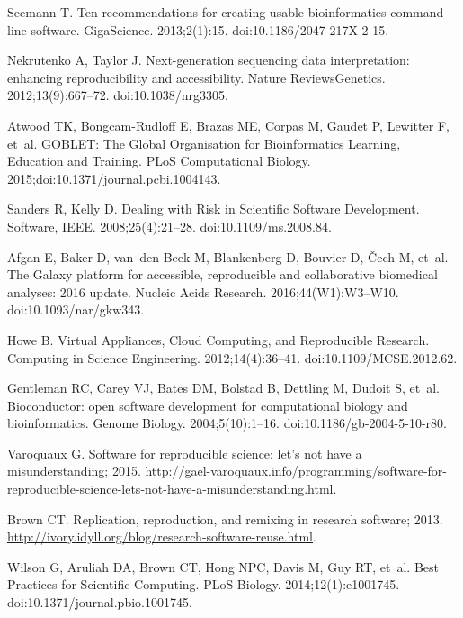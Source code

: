 \documentclass[10pt,letterpaper]{article}
\begin{document}
\begin{thebibliography}{10}
Seemann T.
\newblock Ten recommendations for creating usable bioinformatics command line
  software.
\newblock GigaScience. 2013;2(1):15.
\newblock doi:{10.1186/2047-217X-2-15}.

Nekrutenko A, Taylor J.
\newblock Next-generation sequencing data interpretation: enhancing
  reproducibility and accessibility.
\newblock Nature ReviewsGenetics. 2012;13(9):667--72.
\newblock doi:{10.1038/nrg3305}.

Atwood TK, Bongcam-Rudloff E, Brazas ME, Corpas M, Gaudet P, Lewitter F, et~al.
\newblock GOBLET: The Global Organisation for Bioinformatics Learning,
  Education and Training.
\newblock PLoS Computational Biology. 2015;doi:{10.1371/journal.pcbi.1004143}.

Sanders R, Kelly D.
\newblock Dealing with Risk in Scientific Software Development.
\newblock Software, IEEE. 2008;25(4):21--28.
\newblock doi:{10.1109/ms.2008.84}.

Afgan E, Baker D, van~den Beek M, Blankenberg D, Bouvier D, Čech M, et~al.
\newblock The Galaxy platform for accessible, reproducible and collaborative
  biomedical analyses: 2016 update.
\newblock Nucleic Acids Research. 2016;44(W1):W3--W10.
\newblock doi:{10.1093/nar/gkw343}.

Howe B.
\newblock Virtual Appliances, Cloud Computing, and Reproducible Research.
\newblock Computing in Science Engineering. 2012;14(4):36--41.
\newblock doi:{10.1109/MCSE.2012.62}.

Gentleman RC, Carey VJ, Bates DM, Bolstad B, Dettling M, Dudoit S, et~al.
\newblock Bioconductor: open software development for computational biology and
  bioinformatics.
\newblock Genome Biology. 2004;5(10):1--16.
\newblock doi:{10.1186/gb-2004-5-10-r80}.

Varoquaux G. Software for reproducible science: let’s not have a
  misunderstanding; 2015.
\newblock
  \url{http://gael-varoquaux.info/programming/software-for-reproducible-science-lets-not-have-a-misunderstanding.html}.

Brown CT. Replication, reproduction, and remixing in research software; 2013.
\newblock \url{http://ivory.idyll.org/blog/research-software-reuse.html}.

Wilson G, Aruliah DA, Brown CT, Hong NPC, Davis M, Guy RT, et~al.
\newblock Best Practices for Scientific Computing.
\newblock PLoS Biology. 2014;12(1):e1001745.
\newblock doi:{10.1371/journal.pbio.1001745}.


\end{thebibliography}
\end{document}
